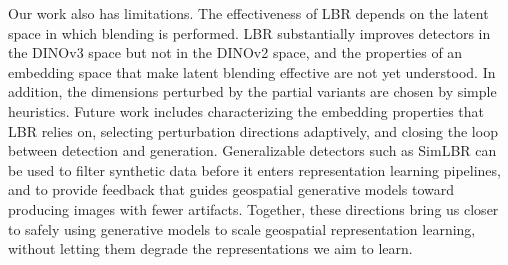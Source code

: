 Our work also has limitations. The effectiveness of LBR depends on the latent space in which blending is performed. LBR substantially improves detectors in the DINOv3 space but not in the DINOv2 space, and the properties of an embedding space that make latent blending effective are not yet understood. In addition, the dimensions perturbed by the partial variants are chosen by simple heuristics. Future work includes characterizing the embedding properties that LBR relies on, selecting perturbation directions adaptively, and closing the loop between detection and generation. Generalizable detectors such as SimLBR can be used to filter synthetic data before it enters representation learning pipelines, and to provide feedback that guides geospatial generative models toward producing images with fewer artifacts. Together, these directions bring us closer to safely using generative models to scale geospatial representation learning, without letting them degrade the representations we aim to learn.
